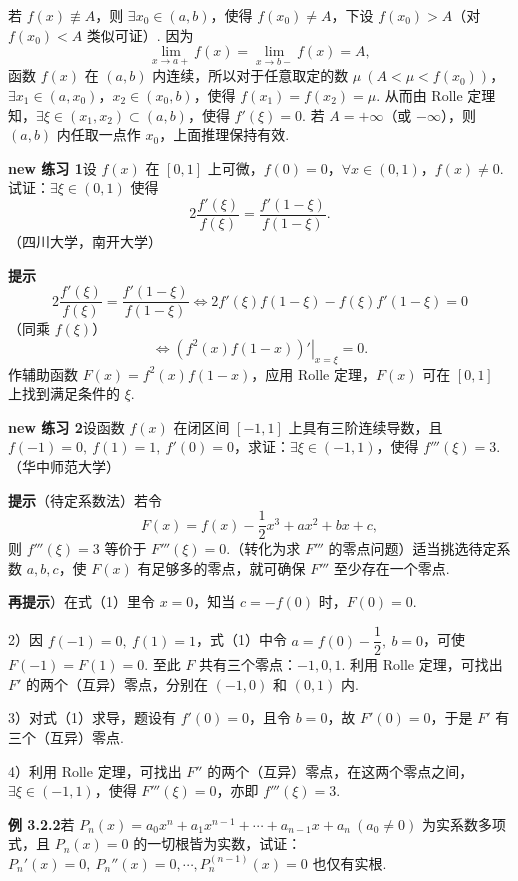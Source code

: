\documentclass[UTF8, 12pt, fontset=fandol, oneside]{ctexart}
\begin{document}
若 $f(x)\not\equiv A$，则 $\exists x_0\in(a,b)$，使得 $f(x_0)\ne A$，下设 $f(x_0)>A$（对 $f(x_0)<A$ 类似可证）. 因为
\[
  \lim_{x\to a+}f(x)=\lim_{x\to b-}f(x)=A,
\]
函数 $f(x)$ 在 $(a,b)$ 内连续，所以对于任意取定的数 $\mu\ (A<\mu<f(x_0))$，$\exists x_1\in(a,x_0)$，$x_2\in(x_0,b)$，使得 $f(x_1)=f(x_2)=\mu$. 从而由 Rolle 定理知，$\exists\xi\in(x_1,x_2)\subset(a,b)$，使得 $f'(\xi)=0$. 若 $A=+\infty$（或 $-\infty$），则 $(a,b)$ 内任取一点作 $x_0$，上面推理保持有效.

\noindent\textbf{new 练习 1}\quad 设 $f(x)$ 在 $[0,1]$ 上可微，$f(0)=0$，$\forall x\in(0,1)$，$f(x)\ne0$. 试证：$\exists\xi\in(0,1)$ 使得
\[
  2\frac{f'(\xi)}{f(\xi)}=\frac{f'(1-\xi)}{f(1-\xi)}.
\]
（四川大学，南开大学）

\noindent\textbf{提示}\quad
\[
  2\frac{f'(\xi)}{f(\xi)}=\frac{f'(1-\xi)}{f(1-\xi)}
  \Longleftrightarrow
  2f'(\xi)f(1-\xi)-f(\xi)f'(1-\xi)=0
\]
（同乘 $f(\xi)$）
\[
  \Longleftrightarrow
  \left.(f^2(x)f(1-x))'\right|_{x=\xi}=0.
\]
作辅助函数 $F(x)=f^2(x)f(1-x)$，应用 Rolle 定理，$F(x)$ 可在 $[0,1]$ 上找到满足条件的 $\xi$.

\noindent\textbf{new 练习 2}\quad 设函数 $f(x)$ 在闭区间 $[-1,1]$ 上具有三阶连续导数，且 $f(-1)=0,\ f(1)=1,\ f'(0)=0$，求证：$\exists\xi\in(-1,1)$，使得 $f'''(\xi)=3$.（华中师范大学）

\noindent\textbf{提示}\quad （待定系数法）若令
\begin{equation}
  F(x)=f(x)-\frac12x^3+ax^2+bx+c,
\tag{1}
\end{equation}
则 $f'''(\xi)=3$ 等价于 $F'''(\xi)=0$.（转化为求 $F'''$ 的零点问题）适当挑选待定系数 $a,b,c$，使 $F(x)$ 有足够多的零点，就可确保 $F'''$ 至少存在一个零点.

\noindent\textbf{再提示}）在式（1）里令 $x=0$，知当 $c=-f(0)$ 时，$F(0)=0$.

2）因 $f(-1)=0,\ f(1)=1$，式（1）中令 $a=f(0)-\dfrac12,\ b=0$，可使 $F(-1)=F(1)=0$. 至此 $F$ 共有三个零点：$-1,0,1$. 利用 Rolle 定理，可找出 $F'$ 的两个（互异）零点，分别在 $(-1,0)$ 和 $(0,1)$ 内.

3）对式（1）求导，题设有 $f'(0)=0$，且令 $b=0$，故 $F'(0)=0$，于是 $F'$ 有三个（互异）零点.

4）利用 Rolle 定理，可找出 $F''$ 的两个（互异）零点，在这两个零点之间，$\exists\xi\in(-1,1)$，使得 $F'''(\xi)=0$，亦即 $f'''(\xi)=3$.

\noindent\textbf{例 3.2.2}\quad 若 $P_n(x)=a_0x^n+a_1x^{n-1}+\cdots+a_{n-1}x+a_n\ (a_0\ne0)$ 为实系数多项式，且 $P_n(x)=0$ 的一切根皆为实数，试证：$P_n'(x)=0,\ P_n''(x)=0,\cdots,P_n^{(n-1)}(x)=0$ 也仅有实根.
\end{document}
